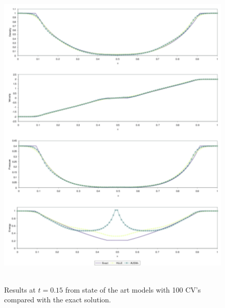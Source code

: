 \begin{figure}[H]
\vbox{
\hbox{
\hspace{-1.cm}
\includegraphics[width=16.0cm]{./doc_figures/shock/Screenshot-123prob-res}
}
\vspace{-0.cm}
\vspace{-0.cm}}
\label{Screenshot-123prob-res}
\caption{ Results at $t=0.15$ from state of the art models 
with 100 CV's compared with the exact solution.   }
\end{figure}


